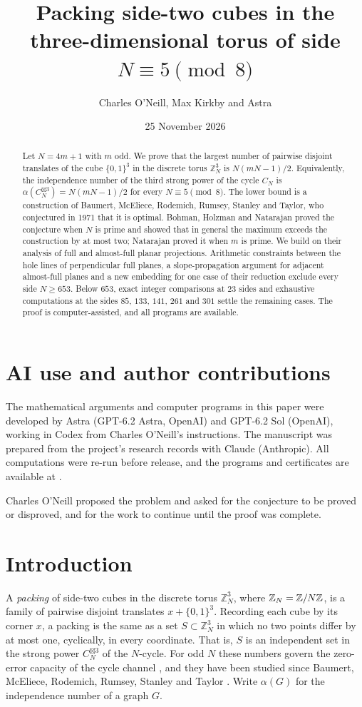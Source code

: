 \documentclass[11pt,colorlinks]{charlie}
\title{Packing side-two cubes in the three-dimensional torus of side $N\equiv5\pmod 8$}
\author{Charles O'Neill, Max Kirkby and Astra}
\date{25 November 2026}
\newcommand{\ZN}{\mathbb{Z}_N}
\newcommand{\spow}{\boxtimes}
\renewcommand{\aiusestatement}{The mathematical arguments and computer programs in this paper were developed by Astra (GPT-6.2 Astra, OpenAI) and GPT-6.2 Sol (OpenAI), working in Codex from Charles O'Neill's instructions. The manuscript was prepared from the project's research records with Claude (Anthropic). All computations were re-run before release, and the programs and certificates are available at \coderepo.}
\begin{document}
\maketitle

\begin{abstract}
Let $N=4m+1$ with $m$ odd. We prove that the largest number of pairwise disjoint translates of the cube $\{0,1\}^3$ in the discrete torus $\ZN^3$ is $N(mN-1)/2$. Equivalently, the independence number of the third strong power of the cycle $C_N$ is $\alpha(C_N^{\spow3})=N(mN-1)/2$ for every $N\equiv5\pmod8$. The lower bound is a construction of Baumert, McEliece, Rodemich, Rumsey, Stanley and Taylor, who conjectured in 1971 that it is optimal. Bohman, Holzman and Natarajan proved the conjecture when $N$ is prime and showed that in general the maximum exceeds the construction by at most two; Natarajan proved it when $m$ is prime. We build on their analysis of full and almost-full planar projections. Arithmetic constraints between the hole lines of perpendicular full planes, a slope-propagation argument for adjacent almost-full planes and a new embedding for one case of their reduction exclude every side $N\ge653$. Below $653$, exact integer comparisons at $23$ sides and exhaustive computations at the sides $85$, $133$, $141$, $261$ and $301$ settle the remaining cases. The proof is computer-assisted, and all programs are available.
\end{abstract}

\section*{AI use and author contributions}
\aiusestatement

Charles O'Neill proposed the problem and asked for the conjecture to be proved or disproved, and for the work to continue until the proof was complete. \responsibilitystatement

\section{Introduction}
A \emph{packing} of side-two cubes in the discrete torus $\ZN^3$, where $\ZN=\Z/N\Z$, is a family of pairwise disjoint translates $x+\{0,1\}^3$. Recording each cube by its corner $x$, a packing is the same as a set $S\subset\ZN^3$ in which no two points differ by at most one, cyclically, in every coordinate. That is, $S$ is an independent set in the strong power $C_N^{\spow3}$ of the $N$-cycle. For odd $N$ these numbers govern the zero-error capacity of the cycle channel \cite{Lovasz}, and they have been studied since Baumert, McEliece, Rodemich, Rumsey, Stanley and Taylor \cite{BBC}. Write $\alpha(G)$ for the independence number of a graph $G$.
\end{document}
